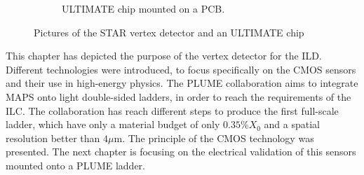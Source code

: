 \begin{figure}[!h]
\begin{subfigure}[t]{0.4\textwidth}
        \caption{ULTIMATE chip mounted on a PCB. %
        }
        \label{fig:ultimate}
    \end{subfigure}
    \caption{Pictures of the STAR vertex detector and an ULTIMATE chip}\label{fig:Mi28}
    \end{figure}    


    This chapter has depicted the purpose of the vertex detector for the \gls{ILD}.
    Different technologies were introduced, to focus specifically on the \gls{CMOS} sensors and their use in high-energy physics.
    The \gls{PLUME} collaboration aims to integrate \gls{MAPS} onto light double-sided ladders, in order to reach the requirements of the \gls{ILC}.
    The collaboration has reach different steps to produce the first full-scale ladder, which have only a material budget of only $0.35\% X_0$ and a spatial resolution better than $4\mu\text{m}$.
    The principle of the \gls{CMOS} technology was presented. 
    The next chapter is focusing on the electrical validation of this sensors mounted onto a PLUME ladder.

    


